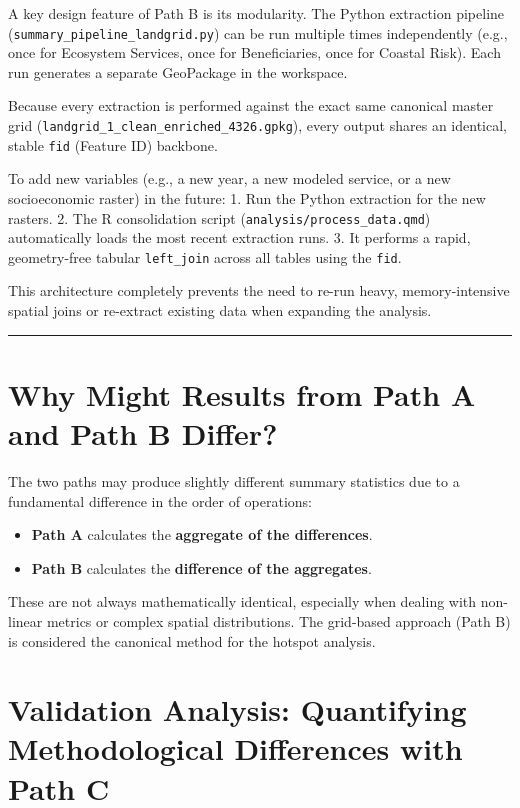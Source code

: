 \documentclass[
  letterpaper,
  DIV=11,
  numbers=noendperiod]{scrreprt}
\providecommand{\tightlist}{%
  \setlength{\itemsep}{0pt}\setlength{\parskip}{0pt}}
\begin{document}
A key design feature of Path B is its modularity. The Python extraction
pipeline (\texttt{summary\_pipeline\_landgrid.py}) can be run multiple
times independently (e.g., once for Ecosystem Services, once for
Beneficiaries, once for Coastal Risk). Each run generates a separate
GeoPackage in the workspace.

Because every extraction is performed against the exact same canonical
master grid (\texttt{landgrid\_1\_clean\_enriched\_4326.gpkg}), every
output shares an identical, stable \texttt{fid} (Feature ID) backbone.

To add new variables (e.g., a new year, a new modeled service, or a new
socioeconomic raster) in the future: 1. Run the Python extraction for
the new rasters. 2. The R consolidation script
(\texttt{analysis/process\_data.qmd}) automatically loads the most
recent extraction runs. 3. It performs a rapid, geometry-free tabular
\texttt{left\_join} across all tables using the \texttt{fid}.

This architecture completely prevents the need to re-run heavy,
memory-intensive spatial joins or re-extract existing data when
expanding the analysis.

\begin{center}\rule{0.5\linewidth}{0.5pt}\end{center}

\section{Why Might Results from Path A and Path B
Differ?}\label{why-might-results-from-path-a-and-path-b-differ}

The two paths may produce slightly different summary statistics due to a
fundamental difference in the order of operations:

\begin{itemize}
\tightlist
\item
  \textbf{Path A} calculates the \textbf{aggregate of the differences}.
\item
  \textbf{Path B} calculates the \textbf{difference of the aggregates}.
\end{itemize}

These are not always mathematically identical, especially when dealing
with non-linear metrics or complex spatial distributions. The grid-based
approach (Path B) is considered the canonical method for the hotspot
analysis.

\section{Validation Analysis: Quantifying Methodological Differences
with Path
C}\label{validation-analysis-quantifying-methodological-differences-with-path-c}
\end{document}
